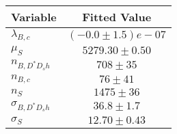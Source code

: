 \begin{tabular}[t]{lc}
\hline
Variable &Fitted Value\\
\hline\hline
$\lambda_{B,c}$&$(-0.0\pm1.5)e-07$\\
\hline
$\mu_S$&$5279.30\pm0.50$\\
\hline
$n_{B, D^* D_s h}$&$708\pm35$\\
\hline
$n_{B,c}$&$76\pm41$\\
\hline
$n_S$&$1475\pm36$\\
\hline
$\sigma_{B, D^* D_s h}$&$36.8\pm1.7$\\
\hline
$\sigma_S$&$12.70\pm0.43$\\
\hline
\end{tabular}